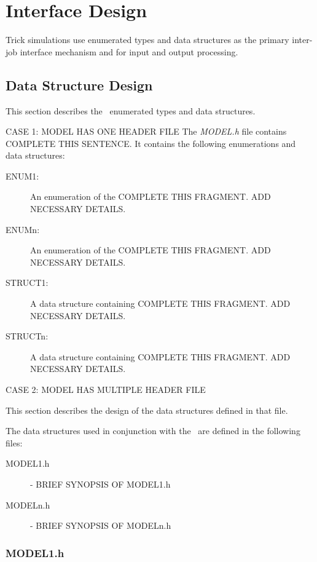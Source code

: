 \documentclass[twoside,11pt,titlepage]{report}
\begin{document}
\chapter{Interface Design}\label{sec:interface_design}

Trick simulations use enumerated types and data structures as the
primary inter-job interface mechanism and for input and output processing.

\section{Data Structure Design}

This section describes the \MODEL\ enumerated types and data structures.

CASE 1: MODEL HAS ONE HEADER FILE
The {\em MODEL.h} file contains COMPLETE THIS SENTENCE.
It contains the following enumerations and data structures:
\begin{description}

\item [ENUM1:] An enumeration of the COMPLETE THIS FRAGMENT.
ADD NECESSARY DETAILS.

\item [ENUMn:] An enumeration of the COMPLETE THIS FRAGMENT.
ADD NECESSARY DETAILS.

\item [STRUCT1:] A data structure containing COMPLETE THIS FRAGMENT.
ADD NECESSARY DETAILS.

\item [STRUCTn:] A data structure containing COMPLETE THIS FRAGMENT.
ADD NECESSARY DETAILS.

\end{description}

% 

CASE 2: MODEL HAS MULTIPLE HEADER FILE

This section describes the design of the data structures
defined in that file.

The data structures used in conjunction with the
\MODEL\ are defined in the following files:
\begin{description}
\item[MODEL1.h] - BRIEF SYNOPSIS OF MODEL1.h
\item[MODELn.h] - BRIEF SYNOPSIS OF MODELn.h
\end{description}

\subsection{MODEL1.h}
\end{document}
